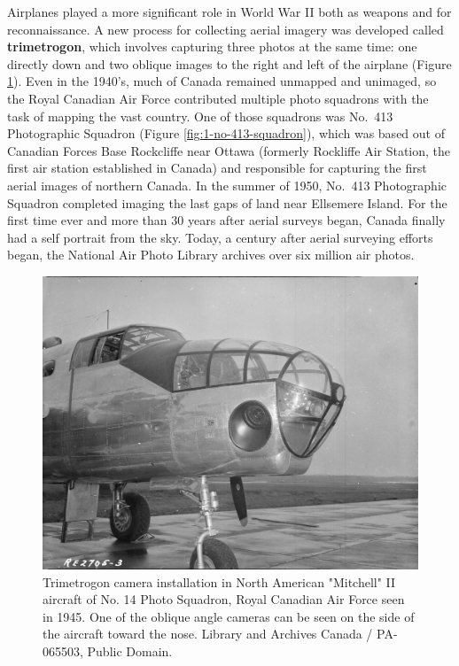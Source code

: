 \documentclass[
]{book}
\begin{document}
Airplanes played a more significant role in World War II both as weapons and for reconnaissance. A new process for collecting aerial imagery was developed called \textbf{trimetrogon}, which involves capturing three photos at the same time: one directly down and two oblique images to the right and left of the airplane (Figure \ref{fig:1-trimetrogon-airplane}). Even in the 1940's, much of Canada remained unmapped and unimaged, so the Royal Canadian Air Force contributed multiple photo squadrons with the task of mapping the vast country. One of those squadrons was No.~413 Photographic Squadron (Figure \ref{fig:1-no-413-squadron}), which was based out of Canadian Forces Base Rockcliffe near Ottawa (formerly Rockliffe Air Station, the first air station established in Canada) and responsible for capturing the first aerial images of northern Canada. In the summer of 1950, No.~413 Photographic Squadron completed imaging the last gaps of land near Ellsemere Island. For the first time ever and more than 30 years after aerial surveys began, Canada finally had a self portrait from the sky. Today, a century after aerial surveying efforts began, the National Air Photo Library archives over six million air photos.

\begin{figure}
\includegraphics[width=0.75\linewidth]{images/01-trimetrogon-airplane} \caption{Trimetrogon camera installation in North American "Mitchell" II aircraft of No. 14 Photo Squadron, Royal Canadian Air Force seen in 1945. One of the oblique angle cameras can be seen on the side of the aircraft toward the nose. Library and Archives Canada / PA-065503, Public Domain.}\label{fig:1-trimetrogon-airplane}
\end{figure}
\end{document}
